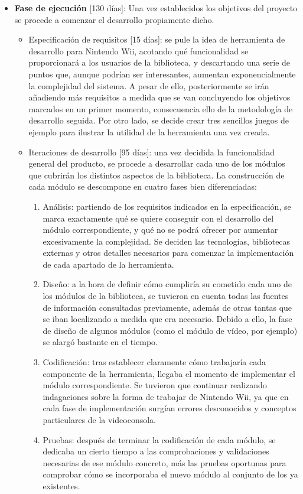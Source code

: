 \begin{itemize}
\item \textbf{Fase de ejecución} [130 días]: Una vez establecidos los objetivos del proyecto se procede a comenzar el desarrollo propiamente dicho.
	\begin{itemize}
	\item Especificación de requisitos [15 días]: se pule la idea de herramienta de desarrollo para Nintendo Wii, acotando qué funcionalidad se proporcionará a los usuarios de la biblioteca, y descartando una serie de puntos que, aunque podrían ser interesantes, aumentan exponencialmente la complejidad del sistema. A pesar de ello, posteriormente se irán añadiendo más requisitos a medida que se van concluyendo los objetivos marcados en un primer momento, consecuencia ello de la metodología de desarrollo seguida. Por otro lado, se decide crear tres sencillos juegos de ejemplo para ilustrar la utilidad de la herramienta una vez creada.
	\item Iteraciones de desarrollo [95 días]: una vez decidida la funcionalidad general del producto, se procede a desarrollar cada uno de los módulos que cubrirán los distintos aspectos de la biblioteca. La construcción de cada módulo se descompone en cuatro fases bien diferenciadas:
		\begin{enumerate}
		\item Análisis: partiendo de los requisitos indicados en la especificación, se marca exactamente qué se quiere conseguir con el desarrollo del módulo correspondiente, y qué no se podrá ofrecer por aumentar excesivamente la complejidad. Se deciden las tecnologías, bibliotecas externas y otros detalles necesarios para comenzar la implementación de cada apartado de la herramienta.
		\item Diseño: a la hora de definir cómo cumpliría su cometido cada uno de los módulos de la biblioteca, se tuvieron en cuenta todas las fuentes de información consultadas previamente, además de otras tantas que se iban localizando a medida que era necesario. Debido a ello, la fase de diseño de algunos módulos (como el módulo de vídeo, por ejemplo) se alargó bastante en el tiempo.
		\item Codificación: tras establecer claramente cómo trabajaría cada componente de la herramienta, llegaba el momento de implementar el módulo correspondiente. Se tuvieron que continuar realizando indagaciones sobre la forma de trabajar de Nintendo Wii, ya que en cada fase de implementación surgían errores desconocidos y conceptos particulares de la videoconsola.
		\item Pruebas: después de terminar la codificación de cada módulo, se dedicaba un cierto tiempo a las comprobaciones y validaciones necesarias de ese módulo concreto, más las pruebas oportunas para comprobar cómo se incorporaba el nuevo módulo al conjunto de los ya existentes.

\end{enumerate}
\end{itemize}
\end{itemize}
